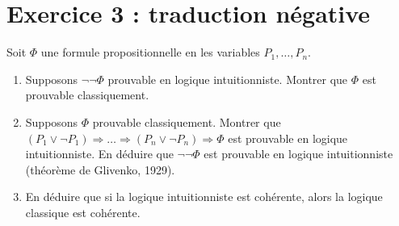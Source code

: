 \documentclass{article}
\begin{document}
\section*{Exercice 3 : traduction négative}

Soit \(\Phi\) une formule propositionnelle en les variables \(P_1, \dots, P_n\).

\begin{enumerate}
\item Supposons \(\neg \neg \Phi\) prouvable en logique intuitionniste. Montrer que \(\Phi\) est prouvable classiquement.
\item Supposons \(\Phi\) prouvable classiquement. Montrer que \((P_1 \vee \neg P_1) \Rightarrow \dots \Rightarrow (P_n \vee \neg P_n) \Rightarrow \Phi\) est prouvable en logique intuitionniste. En déduire que \(\neg \neg \Phi\) est prouvable en logique intuitionniste (théorème de Glivenko, 1929).
\item En déduire que si la logique intuitionniste est cohérente, alors la logique classique est cohérente.
\end{enumerate}
\end{document}
